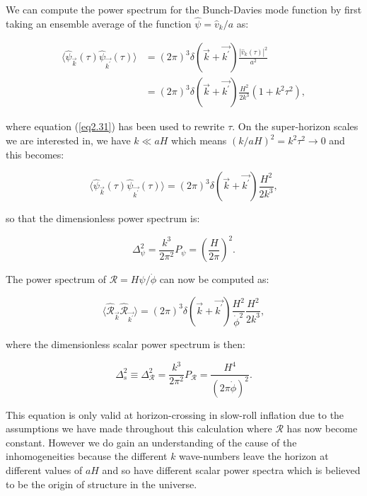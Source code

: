 \documentclass[a4paper,12pt,twoside]{report}
\begin{document}
We can compute the power spectrum for the Bunch-Davies mode function by first taking an ensemble average of the function $\hat{\psi} = \hat{v}_{k}/a$ as:

\begin{equation} \label{eq2.74}
\begin{aligned}
\langle \hat{\psi}_{\vec{k}}(\tau) \hat{\psi}_{\vec{k^{\prime}}}(\tau) \rangle &= (2\pi)^{3}\delta(\vec{k} + \vec{k^{\prime}}) \frac{| \hat{v}_{k}(\tau) |^{2}}{a^{2}} \\
&= (2\pi)^{3}\delta(\vec{k} + \vec{k^{\prime}}) \frac{H^{2}}{2k^{3}} (1 + k^{2}\tau^{2}), 
\end{aligned}
\end{equation}

where equation (\ref{eq2.31}) has been used to rewrite $\tau$. On the super-horizon scales we are interested in, we have $k \ll aH$ which means $(k/aH)^{2} = k^{2}\tau^{2} \rightarrow 0$ and this becomes:

\begin{equation} \label{eq2.75}
\langle \hat{\psi}_{\vec{k}}(\tau) \hat{\psi}_{\vec{k^{\prime}}}(\tau) \rangle = (2\pi)^{3}\delta(\vec{k} + \vec{k^{\prime}}) \frac{H^{2}}{2k^{3}},
\end{equation}

so that the dimensionless power spectrum is:

\begin{equation} \label{eq2.76}
\Delta^{2}_{\psi} = \frac{k^{3}}{2\pi^{2}}P_{\psi} = \left(\frac{H}{2 \pi}\right)^{2}.
\end{equation}

The power spectrum of $\mathcal{R} = H\psi/\dot{\phi}$ can now be computed as:

\begin{equation} \label{eq2.77}
\langle \hat{\mathcal{R}}_{\vec{k}} \hat{\mathcal{R}}_{\vec{k^{\prime}}} \rangle = (2\pi)^{3}\delta(\vec{k} + \vec{k^{\prime}}) \frac{H^{2}}{\dot{\phi}^{2}} \frac{H^{2}}{2k^{3}},
\end{equation}

where the dimensionless scalar power spectrum is then:

\begin{equation} \label{eq2.78}
\Delta^{2}_{s} \equiv \Delta^{2}_{\mathcal{R}} = \frac{k^{3}}{2\pi^{2}} P_{\mathcal{R}} = \frac{H^{4}}{(2 \pi \dot{\phi})^{2}}.
\end{equation}

This equation is only valid at horizon-crossing in slow-roll inflation due to the assumptions we have made throughout this calculation where $\mathcal{R}$ has now become constant. However we do gain an understanding of the cause of the inhomogeneities because the different $k$ wave-numbers leave the horizon at different values of $aH$ and so have different scalar power spectra which is believed to be the origin of structure in the universe.
\end{document}
